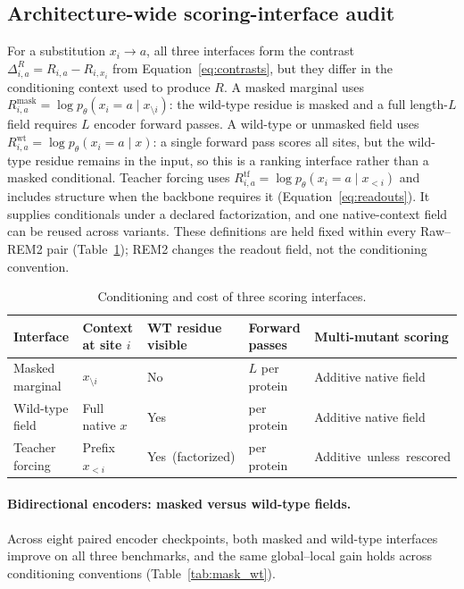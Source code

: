 \documentclass{article} %
\begin{document}
\subsection{Architecture-wide scoring-interface audit}
For a substitution $x_i\!\rightarrow\!a$, all three interfaces form the contrast $\Delta^R_{i,a}=R_{i,a}-R_{i,x_i}$ from Equation~\ref{eq:contrasts}, but they differ in the conditioning context used to produce $R$. A masked marginal uses $R^{\mathrm{mask}}_{i,a}=\log p_\theta(x_i=a \mid x_{\setminus i})$: the wild-type residue is masked and a full length-$L$ field requires $L$ encoder forward passes. A wild-type or unmasked field uses $R^{\mathrm{wt}}_{i,a}=\log p_\theta(x_i=a \mid x)$: a single forward pass scores all sites, but the wild-type residue remains in the input, so this is a ranking interface rather than a masked conditional. Teacher forcing uses $R^{\mathrm{tf}}_{i,a}=\log p_\theta(x_i=a \mid x_{<i})$ and includes structure when the backbone requires it (Equation~\ref{eq:readouts}). It supplies conditionals under a declared factorization, and one native-context field can be reused across variants. These definitions are held fixed within every Raw--\textsc{REM2} pair (Table~\ref{tab:score_interfaces}); \textsc{REM2} changes the readout field, not the conditioning convention.

\begin{table}[!ht]
\caption{Conditioning and cost of three scoring interfaces.}
\label{tab:score_interfaces}
\centering
\footnotesize
\setlength{\tabcolsep}{2pt}
\begin{tabular}{@{}>{\raggedright\arraybackslash}p{}>{\raggedright\arraybackslash}p{}>{\raggedright\arraybackslash}p{}>{\raggedright\arraybackslash}p{}>{\raggedright\arraybackslash}p{}@{}}
\toprule
Interface & Context at site $i$ & WT residue visible & Forward passes & Multi-mutant scoring \\
\midrule
Masked marginal & $x_{\setminus i}$ & No & $L$ per protein & Additive native field \\
Wild-type field & Full native $x$ & Yes & 1 per protein & Additive native field \\
Teacher forcing & Prefix $x_{<i}$ & \mbox{Yes (factorized)} & 1 per protein & \mbox{Additive unless rescored} \\
\bottomrule
\end{tabular}
\end{table}


\paragraph{Bidirectional encoders: masked versus wild-type fields.}
Across eight paired encoder checkpoints, both masked and wild-type interfaces improve on all three benchmarks, and the same global--local gain holds across conditioning conventions (Table~\ref{tab:mask_wt}).
\end{document}
